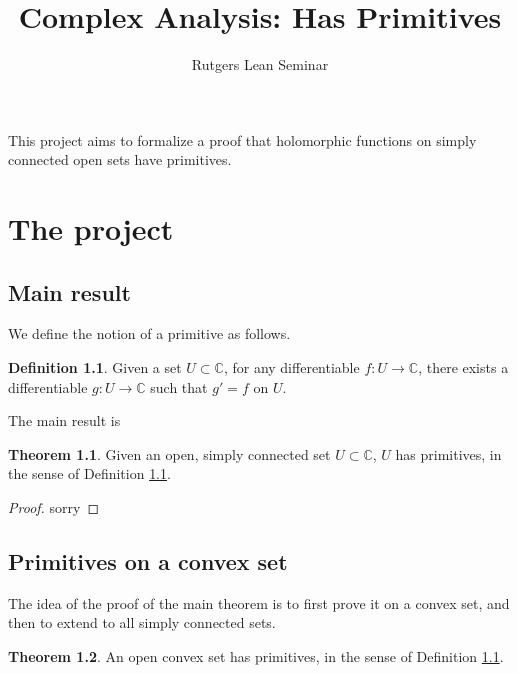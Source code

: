 \documentclass{report}
\title{Complex Analysis: Has Primitives}
\author{Rutgers Lean Seminar}
\theoremstyle{definition}
\newtheorem{definition}{Definition}
\newtheorem{theorem}{Theorem}
\begin{document}
\maketitle

This project aims to formalize a proof that holomorphic functions on simply connected open sets have primitives.

\chapter{The project}

\section{Main result}


We define the notion of a primitive as follows.

\begin{definition}
  \label{hasPrimitives}
  \leanok
  Given a set $U\subset\mathbb C$, for any differentiable $f:U\to\mathbb C$, there exists a differentiable $g:U\to\mathbb C$ such that $g'=f$ on $U$.
\end{definition}

The main result is

\begin{theorem}
  \label{hasPrimitivesOfSimplyConnected}
  \leanok
  Given an open, simply connected set $U\subset\mathbb C$, $U$ has primitives, in the sense of Definition \ref{hasPrimitives}.
\end{theorem}

\begin{proof}
  sorry
\end{proof}

\section{Primitives on a convex set}
The idea of the proof of the main theorem is to first prove it on a convex set, and then to extend to all simply connected sets.

\begin{theorem}
  \label{hasPrimitivesOfConvex}
  \leanok
  An open convex set has primitives, in the sense of Definition \ref{hasPrimitives}.
\end{theorem}
\end{document}
